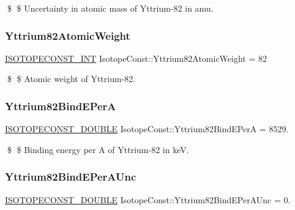 \$ \$ Uncertainty in atomic mass of Yttrium-\/82 in amu. \mbox{\label{group___isotope_const-_yttrium-_y82_gabfe5efdbdbb99a848e43312c7c3e4054}} 
\subsubsection{\texorpdfstring{Yttrium82\+Atomic\+Weight}{Yttrium82AtomicWeight}}
{\footnotesize\ttfamily \mbox{\hyperlink{group___isotope_const-_macros_ga5f18360b3e99483a35c32d789e62621c}{I\+S\+O\+T\+O\+P\+E\+C\+O\+N\+S\+T\+\_\+\+I\+NT}} Isotope\+Const\+::\+Yttrium82\+Atomic\+Weight = 82}

\$ \$ Atomic weight of Yttrium-\/82. \mbox{\label{group___isotope_const-_yttrium-_y82_ga43b4d953bbe424b5a5a1d73bf55aa0aa}} 
\subsubsection{\texorpdfstring{Yttrium82\+Bind\+E\+PerA}{Yttrium82BindEPerA}}
{\footnotesize\ttfamily \mbox{\hyperlink{group___isotope_const-_macros_ga8f45a7272ce02c0b4c65c44636ed719a}{I\+S\+O\+T\+O\+P\+E\+C\+O\+N\+S\+T\+\_\+\+D\+O\+U\+B\+LE}} Isotope\+Const\+::\+Yttrium82\+Bind\+E\+PerA = 8529.}

\$ \$ Binding energy per A of Yttrium-\/82 in keV. \mbox{\label{group___isotope_const-_yttrium-_y82_ga147a41c1f0040c097d2888656c686f0b}} 
\subsubsection{\texorpdfstring{Yttrium82\+Bind\+E\+Per\+A\+Unc}{Yttrium82BindEPerAUnc}}
{\footnotesize\ttfamily \mbox{\hyperlink{group___isotope_const-_macros_ga8f45a7272ce02c0b4c65c44636ed719a}{I\+S\+O\+T\+O\+P\+E\+C\+O\+N\+S\+T\+\_\+\+D\+O\+U\+B\+LE}} Isotope\+Const\+::\+Yttrium82\+Bind\+E\+Per\+A\+Unc = 0.}

